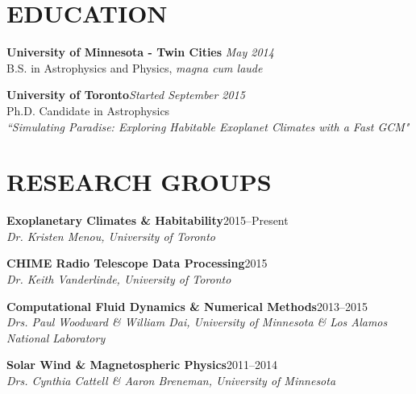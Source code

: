 \documentclass[10pt]{res} %
\begin{document}
\begin{resume}

 
\section{EDUCATION}  

\textbf{University of Minnesota - Twin Cities} \hfill {\sl May 2014}\\
B.S. in Astrophysics and Physics, {\sl magna cum laude}

\textbf{University of Toronto}\hfill{\sl Started September 2015}\\
Ph.D. Candidate in Astrophysics\\
{\sl 
``Simulating Paradise: Exploring Habitable Exoplanet Climates with a Fast GCM"}



\section{RESEARCH GROUPS}

\textbf{Exoplanetary Climates \& Habitability}\hfill 2015--Present\\
\sl{Dr. Kristen Menou, University of Toronto}

\textbf{CHIME Radio Telescope Data Processing}\hfill 2015\\
\sl{Dr. Keith Vanderlinde, University of Toronto}

\textbf{Computational Fluid Dynamics \& Numerical Methods}\hfill 2013--2015\\
\sl{Drs. Paul Woodward \& William Dai, University of Minnesota \& Los Alamos National Laboratory}

\textbf{Solar Wind \& Magnetospheric Physics}\hfill 2011--2014\\
\sl{Drs. Cynthia Cattell \& Aaron Breneman, University of Minnesota}


\end{resume}
\end{document}
